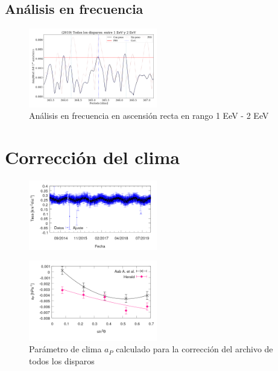 \subsection{Análisis en frecuencia}

\begin{figure}[H]
	\centering
	\includegraphics[width=0.5\textwidth]{2019_AllTriggers_1_2_EeV_con_vs_sin_peso.png}
	\caption{Análisis en frecuencia en ascensión recta en rango 1 EeV - 2 EeV}
	\label{fig:consin}
\end{figure}


\section{Corrección del clima}

\begin{figure}[H]
	\centering
	\includegraphics[width=0.5\textwidth]{rate_Ajuste.png}
\end{figure}



\begin{figure}[H]
	\centering
	\includegraphics[width=0.5\textwidth]{ap_6t5.png}
	\caption{Parámetro de clima $a_P$ calculado para la corrección del archivo de todos los disparos}
\end{figure}

